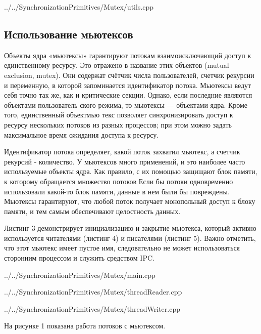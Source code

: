 \documentclass[a4paper, 12pt]{article}		%
\begin{document}

{../../SynchronizationPrimitives/Mutex/utils.cpp}

\newpage
\subsection{Использование мьютексов}

Объекты ядра «мьютексы» гарантируют потокам взаимоисключающий доступ к единственному ресурсу. Это отражено в название этих объектов (mutual exclusion, mutex). Они содержат счётчик числа пользователей, счетчик рекурсии и переменную, в которой запоминается идентификатор потока. Мьютексы ведут себя точно так же, как и критические секции. Однако, если последние являются объектами пользователь ского режима, то мьютексы — объектами ядра. Кроме того, единственный объектмью текс позволяет синхронизировать доступ к ресурсу нескольких потоков из разных процессов; при этом можно задать максимальное время ожидания доступа к ресурсу.

Идентификатор потока определяет, какой поток захватил мьютекс, а счетчик рекурсий - количество. У мьютексов много применений, и это наиболее часто используемые объекты ядра. Как правило, с их помощью защищают блок памяти, к которому обращается множество потоков Если бы потоки одновременно использовали какой-то блок памяти, данные в нем были бы повреждены. Мьютексы гарантируют, что любой поток получает монопольный доступ к блоку памяти, и тем самым обеспечивают целостность данных.

Листинг 3 демонстрирует инициализацию и закрытие мьютекса, который активно используется читателями (листинг 4) и писателями (листинг 5). Важно отметить, что этот мьютекс имеет пустое имя, следовательно не может использоваться сторонним процессом и служить средством IPC.


{../../SynchronizationPrimitives/Mutex/main.cpp}


{../../SynchronizationPrimitives/Mutex/threadReader.cpp}


{../../SynchronizationPrimitives/Mutex/threadWriter.cpp}

На рисунке 1 показана работа потоков с мьютексом.
\end{document}
